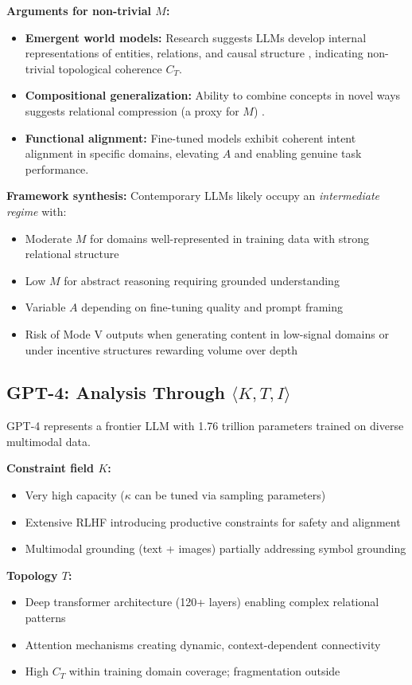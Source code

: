 \documentclass[12pt]{article}
\begin{document}
\textbf{Arguments for non-trivial $M$:}
\begin{itemize}
\item \textbf{Emergent world models:} Research suggests LLMs develop internal representations of entities, relations, and causal structure \citep{li2023emergent}, indicating non-trivial topological coherence $C_T$.
\item \textbf{Compositional generalization:} Ability to combine concepts in novel ways suggests relational compression (a proxy for $M$) \citep{lake2018generalization}.
\item \textbf{Functional alignment:} Fine-tuned models exhibit coherent intent alignment in specific domains, elevating $A$ and enabling genuine task performance.
\end{itemize}

\textbf{Framework synthesis:} Contemporary LLMs likely occupy an \textit{intermediate regime} with:
\begin{itemize}
\item Moderate $M$ for domains well-represented in training data with strong relational structure
\item Low $M$ for abstract reasoning requiring grounded understanding
\item Variable $A$ depending on fine-tuning quality and prompt framing
\item Risk of Mode V outputs when generating content in low-signal domains or under incentive structures rewarding volume over depth
\end{itemize}

\subsection{GPT-4: Analysis Through $\langle K, T, I \rangle$}

GPT-4 represents a frontier LLM with 1.76 trillion parameters trained on diverse multimodal data.

\textbf{Constraint field $K$:}
\begin{itemize}
\item Very high capacity ($\kappa$ can be tuned via sampling parameters)
\item Extensive RLHF introducing productive constraints for safety and alignment
\item Multimodal grounding (text + images) partially addressing symbol grounding
\end{itemize}

\textbf{Topology $T$:}
\begin{itemize}
\item Deep transformer architecture (120+ layers) enabling complex relational patterns
\item Attention mechanisms creating dynamic, context-dependent connectivity
\item High $C_T$ within training domain coverage; fragmentation outside
\end{itemize}
\end{document}
